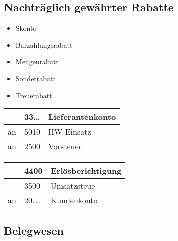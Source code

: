 \documentclass[letterpaper,10pt,english]{sphinxmanual}
\begin{document}
\subsection{Nachträglich gewährter Rabatte}
\label{\detokenize{pool1:nachtraglich-gewahrter-rabatte}}
\begin{itemize}
\item {} 
Skonto

\item {} 
Barzahlungsrabatt

\item {} 
Mengenrabatt

\item {} 
Sonderrabatt

\item {} 
Treuerabatt

\end{itemize}



\begin{savenotes}\sphinxattablestart
\centering
\begin{tabulary}{\linewidth}[t]{|T|T|T|}
\hline
&
33…
&
Lieferantenkonto
\\
\hline
an
&
5010
&
HW-Einsatz
\\
\hline
an
&
2500
&
Vorsteuer
\\
\hline
\end{tabulary}
\par
\sphinxattableend\end{savenotes}



\begin{savenotes}\sphinxattablestart
\centering
\begin{tabulary}{\linewidth}[t]{|T|T|T|}
\hline
&
4400
&
Erlösberichtigung
\\
\hline&
3500
&
Umsatzsteue
\\
\hline
an
&
20…
&
Kundenkonto
\\
\hline
\end{tabulary}
\par
\sphinxattableend\end{savenotes}


\subsection{Belegwesen}
\label{\detokenize{pool1:belegwesen}}
\end{document}
